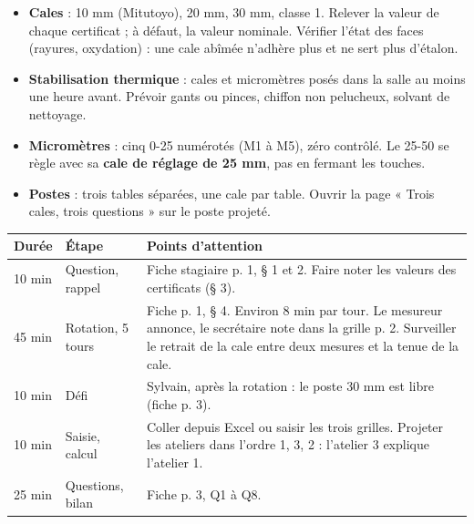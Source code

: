 \documentclass[10pt,a4paper]{article}
\begin{document}
\thispagestyle{fancy}

\begin{itemize}
\item \textbf{Cales} : 10 mm (Mitutoyo), 20 mm, 30 mm, classe 1. Relever la valeur de chaque certificat ; à défaut, la valeur nominale. Vérifier l'état des faces (rayures, oxydation) : une cale abîmée n'adhère plus et ne sert plus d'étalon.
\item \textbf{Stabilisation thermique} : cales et micromètres posés dans la salle au moins une heure avant. Prévoir gants ou pinces, chiffon non pelucheux, solvant de nettoyage.
\item \textbf{Micromètres} : cinq 0-25 numérotés (M1 à M5), zéro contrôlé. Le 25-50 se règle avec sa \textbf{cale de réglage de 25 mm}, pas en fermant les touches.
\item \textbf{Postes} : trois tables séparées, une cale par table. Ouvrir la page « Trois cales, trois questions » sur le poste projeté.
\end{itemize}

\renewcommand{\arraystretch}{1.25}
\begin{tabularx}{\linewidth}{@{}l l X@{}}
\toprule
\textbf{Durée} & \textbf{Étape} & \textbf{Points d'attention}\\\midrule
10 min & Question, rappel & Fiche stagiaire p. 1, § 1 et 2. Faire noter les valeurs des certificats (§ 3).\\
45 min & Rotation, 5 tours & Fiche p. 1, § 4. Environ 8 min par tour. Le mesureur annonce, le secrétaire note dans la grille p. 2. Surveiller le retrait de la cale entre deux mesures et la tenue de la cale.\\
10 min & Défi & Sylvain, après la rotation : le poste 30 mm est libre (fiche p. 3).\\
10 min & Saisie, calcul & Coller depuis Excel ou saisir les trois grilles. Projeter les ateliers dans l'ordre 1, 3, 2 : l'atelier 3 explique l'atelier 1.\\
25 min & Questions, bilan & Fiche p. 3, Q1 à Q8.\\
\bottomrule
\end{tabularx}
\end{document}
